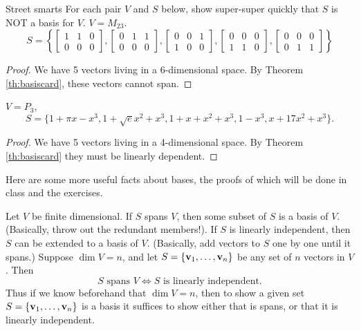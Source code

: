 \begin{frame}{Street smarts}
For each pair $V$ and $S$ below, show super-super quickly that $S$ is NOT a basis for $V$. 
\bb
\ii $V=M_{23}$.
\[
S=\left\{
\begin{bmatrix}
1&1&0\\0&0&0
\end{bmatrix},
\begin{bmatrix}
0&1&1\\
0&0&0
\end{bmatrix},
\begin{bmatrix}
0&0&1\\
1&0&0
\end{bmatrix},
\begin{bmatrix}
0&0&0\\
1&1&0
\end{bmatrix},
\begin{bmatrix}
0&0&0\\
0&1&1
\end{bmatrix}
\right\}
\]
\pause
\begin{proof}
We have 5 vectors living in a 6-dimensional space. By Theorem \ref{th:basiscard}, these vectors cannot span. 
\end{proof}
\pause
\ii $V=P_3$, 
\[
S=\{1+\pi x-x^3, 1+\sqrt{e}x^2+x^3, 1+x+x^2+x^3, 1-x^3, x+17x^2+x^3\}.
\]
\pause\begin{proof}
We have 5 vectors living in a 4-dimensional space. By Theorem \ref{th:basiscard} they must be linearly dependent. 
\end{proof}
\ee
\end{frame}
\begin{frame}
Here are some more useful facts about bases, the proofs of which will be done in class and the exercises. 
\begin{theorem}
Let $V$ be finite dimensional. 
\bb
\pause \ii If $S$ spans $V$, then some subset of $S$ is a basis of $V$. (Basically, throw out the redundant members!).
\pause \ii If $S$ is linearly independent, then $S$ can be extended to a basis of $V$. (Basically, add vectors to $S$ one by one until it spans.) 
\pause \ii Suppose $\dim V=n$, and let $S=\{{\mathbf v}_1,\dots ,{\mathbf v}_n\}$ be any set of $n$ vectors in $V$. Then 
\[
S \text{ spans $V$}\Leftrightarrow S \text{ is linearly independent}.
\]
\pause Thus \alert{if we know beforehand} that $\dim V=n$, then to show a given set $S=\{{\mathbf v}_1,\dots ,{\mathbf v}_n\}$ is a basis it suffices to show either that is spans, or that it is linearly independent. 
\ee
\end{theorem}
\end{frame}

